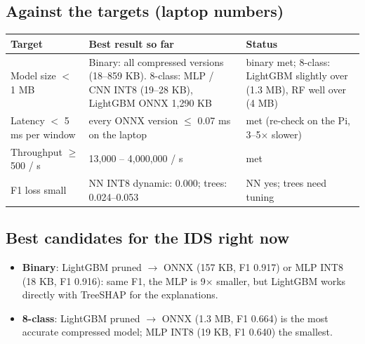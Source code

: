 \documentclass[11pt]{article}
\begin{document}
\subsection*{Against the targets (laptop numbers)}
\begin{longtable}{@{}>{\raggedright}p{4.2cm} >{\raggedright}p{6.4cm} >{\raggedright\arraybackslash}p{5cm}@{}}
\toprule
\textbf{Target} & \textbf{Best result so far} & \textbf{Status} \\
\midrule
\endhead
Model size $<$ 1 MB & Binary: all compressed versions (18--859 KB). 8-class: MLP / CNN INT8 (19--28 KB), LightGBM ONNX 1,290 KB & binary met; 8-class: LightGBM slightly over (1.3 MB), RF well over (4 MB) \\
Latency $<$ 5 ms per window & every ONNX version $\leq$ 0.07 ms on the laptop & met (re-check on the Pi, 3--5$\times$ slower) \\
Throughput $\geq$ 500 / s & 13,000 -- 4,000,000 / s & met \\
F1 loss small & NN INT8 dynamic: 0.000; trees: 0.024--0.053 & NN yes; trees need tuning \\
\bottomrule
\end{longtable}

\subsection*{Best candidates for the IDS right now}
\begin{itemize}
\item \textbf{Binary}: LightGBM pruned $\rightarrow$ ONNX (157 KB, F1 0.917) or MLP INT8 (18 KB, F1 0.916): same F1, the MLP is 9$\times$ smaller,
but LightGBM works directly with TreeSHAP for the explanations.
\item \textbf{8-class}: LightGBM pruned $\rightarrow$ ONNX (1.3 MB, F1 0.664) is the most accurate compressed model; MLP INT8 (19 KB, F1 0.640) the smallest.
\end{itemize}
\end{document}
